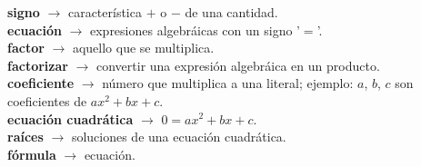 \begin{defcard}
    \textbf{signo} $\rightarrow$ característica $+$ o $-$ de una cantidad.\\
    \textbf{ecuación} $\rightarrow$ expresiones algebráicas con un signo '$=$'.\\
    \textbf{factor} $\rightarrow$ aquello que se multiplica.\\
    \textbf{factorizar} $\rightarrow$ convertir una expresión algebráica en un producto.\\
    \textbf{coeficiente} $\rightarrow$ número que multiplica a una literal; ejemplo: $a$, $b$, $c$ son coeficientes de $ax^2+bx+c$.\\
    \textbf{ecuación cuadrática} $\rightarrow$ $0 = ax^2+bx+c$.\\
    \textbf{raíces} $\rightarrow$ soluciones de una ecuación cuadrática.\\
    \textbf{fórmula} $\rightarrow$ ecuación.
\end{defcard}